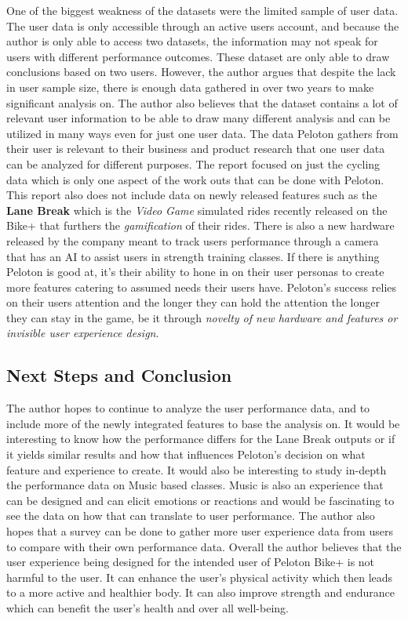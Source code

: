 \documentclass[
]{article}
\begin{document}
One of the biggest weakness of the datasets were the limited sample of user data. The user data is only accessible through an active users account, and because the author is only able to access two datasets, the information may not speak for users with different performance outcomes. These dataset are only able to draw conclusions based on two users. However, the author argues that despite the lack in user sample size, there is enough data gathered in over two years to make significant analysis on. The author also believes that the dataset contains a lot of relevant user information to be able to draw many different analysis and can be utilized in many ways even for just one user data. The data Peloton gathers from their user is relevant to their business and product research that one user data can be analyzed for different purposes. The report focused on just the cycling data which is only one aspect of the work outs that can be done with Peloton. This report also does not include data on newly released features such as the \textbf{Lane Break} which is the \emph{Video Game} simulated rides recently released on the Bike+ that furthers the \emph{gamification} of their rides. There is also a new hardware released by the company meant to track users performance through a camera that has an AI to assist users in strength training classes. If there is anything Peloton is good at, it's their ability to hone in on their user personas to create more features catering to assumed needs their users have. Peloton's success relies on their users attention and the longer they can hold the attention the longer they can stay in the game, be it through \emph{novelty of new hardware and features or invisible user experience design}.

\hypertarget{next-steps-and-conclusion}{%
\subsection{Next Steps and Conclusion}\label{next-steps-and-conclusion}}

The author hopes to continue to analyze the user performance data, and to include more of the newly integrated features to base the analysis on. It would be interesting to know how the performance differs for the Lane Break outputs or if it yields similar results and how that influences Peloton's decision on what feature and experience to create. It would also be interesting to study in-depth the performance data on Music based classes. Music is also an experience that can be designed and can elicit emotions or reactions and would be fascinating to see the data on how that can translate to user performance. The author also hopes that a survey can be done to gather more user experience data from users to compare with their own performance data. Overall the author believes that the user experience being designed for the intended user of Peloton Bike+ is not harmful to the user. It can enhance the user's physical activity which then leads to a more active and healthier body. It can also improve strength and endurance which can benefit the user's health and over all well-being.
\end{document}
